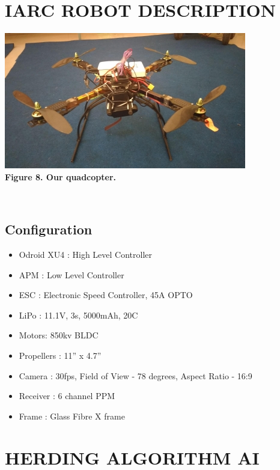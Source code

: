 \documentclass[12pt]{article}
\begin{document}
\section{IARC ROBOT DESCRIPTION}
\begin{center}\includegraphics{image41} \\
\textbf{Figure 8. Our quadcopter.}\end{center}\\
\subsection{Configuration}
\begin{itemize}
    \item Odroid XU4 : High Level Controller
    \item APM : Low Level Controller
    \item ESC     : Electronic Speed Controller, 45A OPTO
    \item LiPo     : 11.1V, 3s, 5000mAh, 20C
    \item Motors: 850kv BLDC
    \item Propellers : 11” x 4.7”
    \item Camera : 30fps, Field of View - 78 degrees, Aspect Ratio - 16:9
    \item Receiver : 6 channel PPM
    \item Frame : Glass Fibre X frame
\end{itemize}

\section{HERDING ALGORITHM AI}
\end{document}
